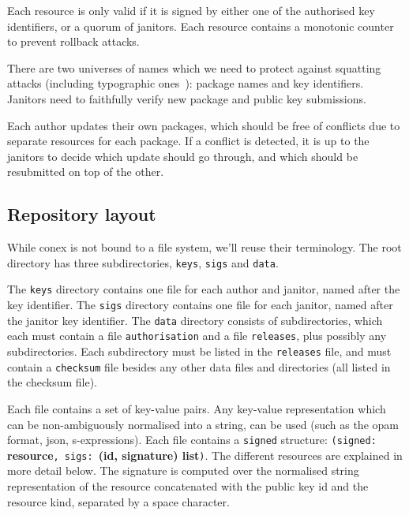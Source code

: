 \documentclass[nocopyrightspace]{sigplanconf}
\begin{document}
Each resource is only valid if it is signed by either one of the authorised key identifiers, or a quorum of janitors.
Each resource contains a monotonic counter to prevent rollback attacks.

There are two universes of names which we need to protect against squatting attacks (including typographic ones~\cite{typo}): package names and key identifiers.
Janitors need to faithfully verify new package and public key submissions.

Each author updates their own packages, which should be free of conflicts due to separate resources for each package.
If a conflict is detected, it is up to the janitors to decide which update should go through, and which should be resubmitted on top of the other.

\subsection{Repository layout}
While conex is not bound to a file system, we'll reuse their terminology.
The root directory has three subdirectories, \texttt{keys}, \texttt{sigs} and \texttt{data}.

The \texttt{keys} directory contains one file for each author and janitor, named after the key identifier.
The \texttt{sigs} directory contains one file for each janitor, named after the janitor key identifier.
The \texttt{data} directory consists of subdirectories, which each must contain a file \texttt{authorisation} and a file \texttt{releases}, plus possibly any subdirectories.
Each subdirectory must be listed in the \texttt{releases} file, and must contain a \texttt{checksum} file besides any other data files and directories (all listed in the checksum file).

Each file contains a set of key-value pairs.
Any key-value representation which can be non-ambiguously normalised into a string, can be used (such as the opam format, json, s-expressions).
Each file contains a \texttt{signed} structure: \texttt{(signed: }\textbf{resource}\texttt{, sigs: }\textbf{(id, signature) list}\texttt{)}.
The different resources are explained in more detail below.
The signature is computed over the normalised string representation of the resource concatenated with the public key id and the resource kind, separated by a space character.
\end{document}

